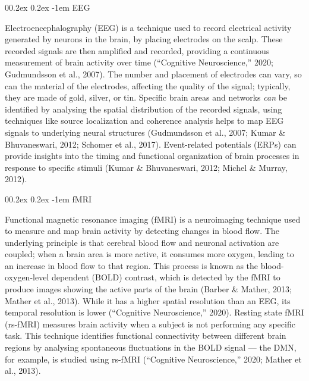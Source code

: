 \documentclass[
  stu, a4paper,floatsintext]{apa7}
\makeatletter
\let\oldparagraph\paragraph
\renewcommand{\paragraph}[1]{\oldparagraph{#1}\mbox{}}
\renewcommand{\paragraph}{\@startsection{paragraph}{4}{\parindent}%
  {0\baselineskip \@plus 0.2ex \@minus 0.2ex}%
  {-1em}%
  {\normalfont\normalsize\bfseries\itshape\typesectitle}}
\renewcommand{\paragraph}{\@startsection{paragraph}{4}{\parindent}%
  {0\baselineskip \@plus 0.2ex \@minus 0.2ex}%
  {-1em}%
  {\normalfont\normalsize\bfseries\typesectitle}}
\makeatother
\begin{document}
\paragraph{EEG}\label{eeg}

Electroencephalography (EEG) is a technique used to record electrical activity generated by neurons in the brain, by placing electrodes on the scalp.
These recorded signals are then amplified and recorded, providing a continuous measurement of brain activity over time ({``Cognitive Neuroscience,''} 2020; Gudmundsson et al., 2007).
The number and placement of electrodes can vary, so can the material of the electrodes, affecting the quality of the signal; typically, they are made of gold, silver, or tin.
Specific brain areas and networks \emph{can} be identified by analysing the spatial distribution of the recorded signals, using techniques like source localization and coherence analysis helps to map EEG signals to underlying neural structures (Gudmundsson et al., 2007; Kumar \& Bhuvaneswari, 2012; Schomer et al., 2017).
Event-related potentials (ERPs) can provide insights into the timing and functional organization of brain processes in response to specific stimuli (Kumar \& Bhuvaneswari, 2012; Michel \& Murray, 2012).

\paragraph{fMRI}\label{fmri}

Functional magnetic resonance imaging (fMRI) is a neuroimaging technique used to measure and map brain activity by detecting changes in blood flow.
The underlying principle is that cerebral blood flow and neuronal activation are coupled; when a brain area is more active, it consumes more oxygen, leading to an increase in blood flow to that region.
This process is known as the blood-oxygen-level dependent (BOLD) contrast, which is detected by the fMRI to produce images showing the active parts of the brain (Barber \& Mather, 2013; Mather et al., 2013).
While it has a higher spatial resolution than an EEG, its temporal resolution is lower ({``Cognitive Neuroscience,''} 2020).
Resting state fMRI (rs-fMRI) measures brain activity when a subject is not performing any specific task.
This technique identifies functional connectivity between different brain regions by analysing spontaneous fluctuations in the BOLD signal --- the DMN, for example, is studied using rs-fMRI ({``Cognitive Neuroscience,''} 2020; Mather et al., 2013).
\end{document}
